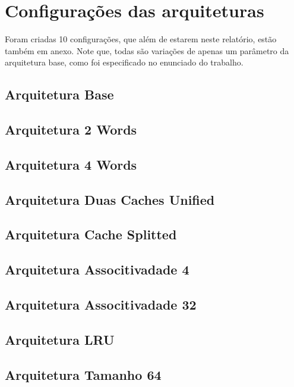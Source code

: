 \documentclass[10pt,a4paper]{article}
\begin{document}
\section{Configurações das arquiteturas}
Foram criadas 10 configurações, que além de estarem neste relatório, estão também em anexo. Note que, todas são variações de apenas um parâmetro da arquitetura base, como foi especificado no enunciado do trabalho.
\subsection{Arquitetura Base}

\subsection{Arquitetura 2 Words}

\subsection{Arquitetura 4 Words}

\subsection{Arquitetura Duas Caches Unified}

\subsection{Arquitetura Cache Splitted}

\subsection{Arquitetura Associtivadade 4}

\subsection{Arquitetura Associtivadade 32}

\subsection{Arquitetura LRU}

\subsection{Arquitetura Tamanho 64}

\end{document}
